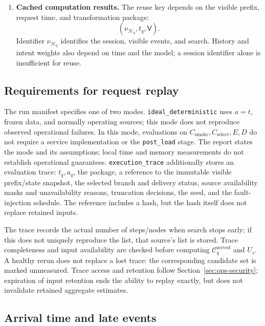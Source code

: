 \documentclass[12pt,a4paper]{article}
\newcommand{\code}[1]{{\ttfamily\small\nolinkurl{#1}}}
\theoremstyle{plainru}
\begin{document}
\begin{enumerate}
\item \textbf{Cached computation results.}
The reuse key depends on the visible prefix,
request time, and transformation package:
\[
(\nu_{\mathcal H_q},t_q,\mathsf V).
\]
Identifier $\nu_{\mathcal H_q}$ identifies the session, visible events,
and search. History and intent weights also depend on time and the model;
a session identifier alone is insufficient for reuse.
\end{enumerate}

\subsection{Requirements for request replay}
\label{sec:ops-replay-trace}

The run manifest specifies one of two modes. \code{ideal_deterministic}
uses $a=t$, frozen data, and normally operating sources; this mode
does not reproduce observed operational failures.
In this mode, evaluations on $C_{\mathrm{smoke}},C_{\mathrm{select}},E,D$
do not require a service implementation or the \code{post_load} stage.
The report states the mode and its assumptions; local time and memory measurements
do not establish operational guarantees.
\code{execution_trace} additionally stores an evaluation trace:
$t_q,a_q$, the package, a reference to the immutable visible prefix/state snapshot,
the selected branch and delivery status, source availability masks and
unavailability reasons, truncation decisions, the seed, and the fault-injection schedule.
The reference includes a hash, but the hash itself does not replace retained inputs.

The trace records the actual number of steps/nodes when search stops
early; if this does not uniquely reproduce the list, that source's list
is stored. Trace completeness and input availability are checked before computing
$\mathcal C_q^{\mathrm{served}}$ and $U_s$. A healthy rerun
does not replace a lost trace: the corresponding candidate set
is marked unmeasured. Trace access and retention follow
Section~\ref{sec:ops-security}; expiration of input retention ends
the ability to replay exactly, but does not invalidate retained aggregate estimates.

\subsection{Arrival time and late events}
\label{sec:ops-event-time-validation}
\end{document}
